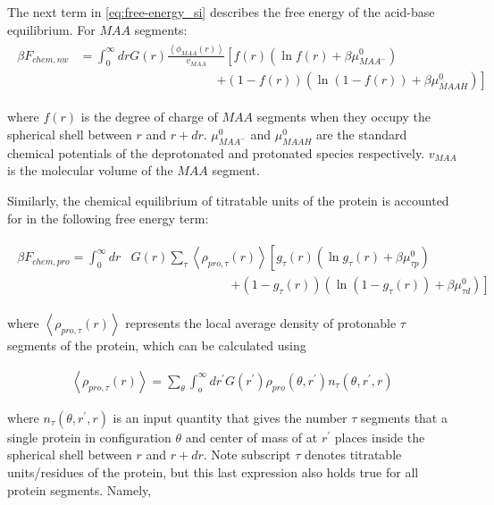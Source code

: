\documentclass[journal=jacsat,manuscript=suppinfo]{achemso}
\begin{document}
The next term in \cref{eq:free-energy_si} describes the free energy of the acid-base equilibrium.
For $MAA$ segments:
\begin{align}
	\begin{aligned}
		\beta F_{chem,nw} &= \int_0^\infty drG(r) \frac{\left<\phi_{MAA}(r)\right>}{v_{MAA}} \left[f(r)(\ln f(r)+ \beta\mu^0_{MAA^-})\right.\\
		&\hspace{11em}\left.+(1-f(r))(\ln (1-f(r))+\beta\mu^0_{MAAH})\right]    
	\end{aligned}
\end{align} 


\noindent where $f(r)$ is the degree of charge of $MAA$ segments when they occupy  the spherical shell between $r$ and $r + dr$. 
$\mu^0_{MAA^-}$ and $\mu^0_{MAAH}$ are the standard chemical potentials of the deprotonated and protonated species respectively. $v_{MAA}$ is the molecular volume of the $MAA$ segment.



Similarly, the chemical equilibrium of titratable units of the protein is accounted for in the following free energy term:

\begin{align}
	\begin{aligned}
		\beta F_{chem,pro} =\int_0^\infty dr &G(r) \sum_\tau \left<\rho_{pro,\tau}(r)\right> \left[g_\tau(r)(\ln g_\tau(r)+ \beta\mu^0_{\tau p})\right.\\
		&\hspace{8em}\left.+(1-g_\tau(r))(\ln (1-g_\tau(r))+\beta\mu^0_{\tau d})\right]   
		\label{eq:Fchempro_si}
	\end{aligned}
\end{align} 

\noindent where $\left<\rho_{pro,\tau}(r)\right>$ represents the local average density of protonable $\tau$ segments of the protein, which can be calculated using

\begin{align}
	\left<\rho_{pro,\tau}(r)\right> = \sum_\theta \int_o^\infty dr^\prime G(r^\prime) \rho_{pro}(\theta,r^\prime)n_\tau(\theta,r^\prime,r)
	\label{eq:segments_pro_si}
\end{align}

\noindent where $n_\tau(\theta,r^\prime,r)$ is an input quantity that gives the number $\tau$ segments that a single protein in configuration $\theta$ and center of mass of at $r^\prime$   places inside the spherical shell between $r$ and $r+dr$. 
Note subscript $\tau$ denotes titratable units/residues of the protein, but this last expression also holds true for all protein segments.
Namely,
\end{document}
